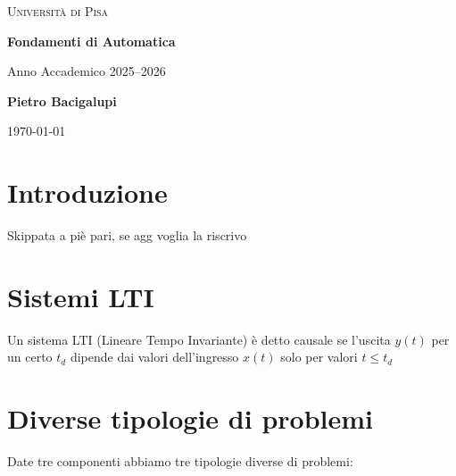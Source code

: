 \documentclass[a4paper,12pt]{article}
\begin{document}
	
	\begin{titlepage}
		\centering
		
		{\scshape\LARGE Università di Pisa \par}
		\vspace{0.5cm}
		
		{\Huge\bfseries Fondamenti di Automatica \par}
		\vspace{0.5cm}
		{\Large Anno Accademico 2025--2026 \par}
		
		\vfill
		
		{\Large\textbf{Pietro Bacigalupi} \par}
		\vspace{0.5cm}
		
		\vfill
		
		{\large \today\par}
		
	\end{titlepage}
	
	\tableofcontents
	\newpage
	\section{Introduzione}
	Skippata a piè pari, se agg voglia la riscrivo
	\newpage
	\section*{Sistemi LTI}
	
	\begin{tcolorbox}[colback=white, colframe=black, arc=0mm, boxrule=0.5pt]
		Un sistema LTI (Lineare Tempo Invariante) è detto causale se l'uscita $y(t)$ per un certo $t_d$ dipende dai valori dell'ingresso $x(t)$ solo per valori $t \leq t_d$
	\end{tcolorbox}
	
	\vspace{1cm}
	
	\section{Diverse tipologie di problemi}
	
	Date tre componenti abbiamo tre tipologie diverse di problemi:
	
\end{document}
